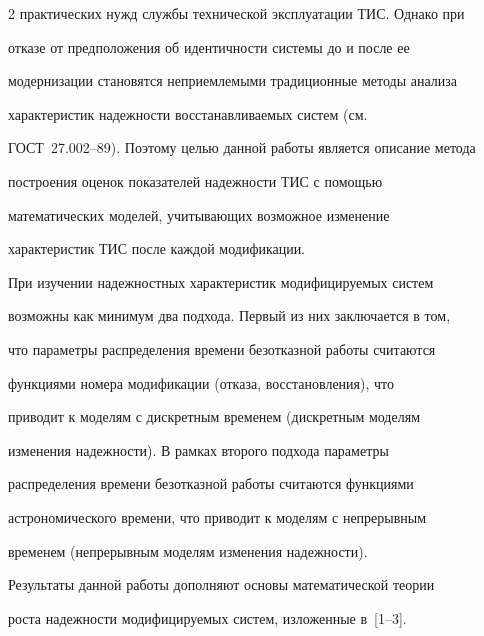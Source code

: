 \begin{multicols}{2}
практических нужд службы технической эксплуатации ТИС. Однако при


отказе от предположения об идентичности системы до и после ее


модернизации становятся неприемлемыми традиционные методы анализа


характеристик надежности восстанавливаемых систем (см.\


ГОСТ~27.002--89). Поэтому целью данной работы является описание метода


построения оценок показателей надежности ТИС с помощью


математических моделей, учитывающих возможное изменение


характеристик ТИС после каждой модификации.


{





}







%





При изучении надежностных характеристик модифицируемых систем


возможны как минимум два подхода. Первый из них заключается в том,


что параметры распределения времени безотказной работы считаются


функциями номера модификации (отказа, восстановления), что


приводит к моделям с дискретным временем (дискретным моделям


изменения надежности). В рамках второго подхода параметры


распределения времени безотказной работы считаются функциями


астрономического времени, что приводит к моделям с непрерывным


временем (непрерывным моделям изменения надежности).





Результаты данной работы дополняют основы математической теории


роста надежности модифицируемых систем, изложенные в~[1--3].





\end{multicols}
